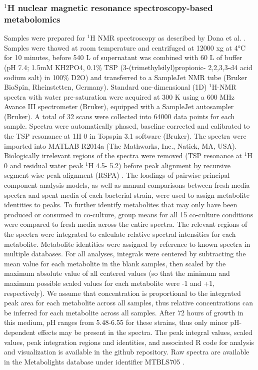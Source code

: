 \documentclass[11pt,onecolumn,notitlepage,openany,twoside]{book}
\begin{document}
\begin{refsection}
\subsubsection{$^1\!$H nuclear magnetic resonance spectroscopy-based metabolomics}

Samples were prepared for $^1\!$H NMR spectroscopy as described by Dona et al. \cite{Dona2014-og}. Samples were thawed at room temperature and centrifuged at 12000 xg at 4°C for 10 minutes, before 540 {\textmu}L of supernatant was combined with 60 {\textmu}L of buffer (pH 7.4; 1.5mM KH2PO4, 0.1\% TSP (3-(trimethylsilyl)propionic- 2,2,3,3-d4 acid sodium salt) in 100\% D2O) and transferred to a SampleJet NMR tube (Bruker BioSpin, Rheinstetten, Germany). Standard one-dimensional (1D) $^1\!$H-NMR spectra with water pre-saturation were acquired at 300 K using a 600 MHz Avance III spectrometer (Bruker), equipped with a SampleJet autosampler (Bruker). A total of 32 scans were collected into 64000 data points for each sample. Spectra were automatically phased, baseline corrected and calibrated to the TSP resonance at {\textdelta}1H 0 in Topspin 3.1 software (Bruker). The spectra were imported into MATLAB R2014a (The Mathworks, Inc., Natick, MA, USA). Biologically irrelevant regions of the spectra were removed (TSP resonance at {\textdelta}$^1\!$H 0 and residual water peak {\textdelta} $^1\!$H 4.5- 5.2) before peak alignment by recursive segment-wise peak alignment (RSPA) \cite{Veselkov2009-ha}. The loadings of pairwise principal component analysis models, as well as manual comparisons between fresh media spectra and spent media of each bacterial strain, were used to assign metabolite identities to peaks. To further identify metabolites that may only have been produced or consumed in co-culture, group means for all 15 co-culture conditions were compared to fresh media across the entire spectra. The relevant regions of the spectra were integrated to calculate relative spectral intensities for each metabolite. Metabolite identities were assigned by reference to known spectra in multiple databases. For all analyses, integrals were centered by subtracting the mean value for each metabolite in the blank samples, then scaled by the maximum absolute value of all centered values (so that the minimum and maximum possible scaled values for each metabolite were -1 and +1, respectively). We assume that concentration is proportional to the integrated peak area for each metabolite across all samples, thus relative concentrations can be inferred for each metabolite across all samples. After 72 hours of growth in this medium, pH ranges from 5.48-6.55 for these strains, thus only minor pH-dependent effects may be present in the spectra. The peak integral values, scaled values, peak integration regions and identities, and associated R code for analysis and visualization is available in the github repository. Raw spectra are available in the Metabolights database under identifier MTBLS705 \cite{Kale2016-aa}.


\end{refsection}
\end{document}
